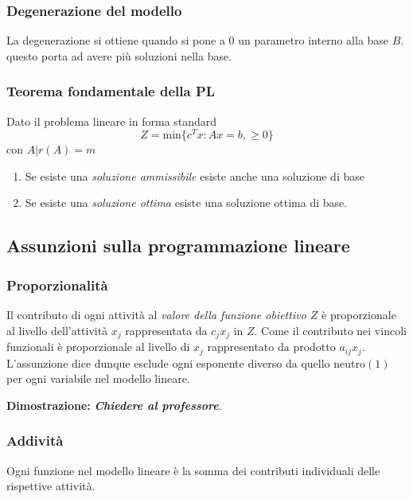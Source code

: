 \documentclass{article}
\begin{document}
    \subsubsection{Degenerazione del modello} 
      La degenerazione si ottiene quando si pone a $0$ un parametro interno alla base $B$. questo porta ad avere più soluzioni nella base.

    \subsubsection{\textbf{Teorema fondamentale della PL}}
      Dato il problema lineare in forma standard
      $$Z=\text{min}\{c^Tx:Ax=b, \ge 0 \}$$
      con $A|r(A)=m$ 
      \begin{enumerate}
        \item Se esiste una \textit{soluzione ammissibile} esiste anche una soluzione di base
        \item Se esiste una \textit{soluzione ottima} esiste una soluzione ottima di base.
      \end{enumerate}

    \subsection{Assunzioni sulla programmazione lineare}
      
      \subsubsection{Proporzionalità}
        Il contributo di ogni attività al \textit{valore della funzione obiettivo $Z$} è proporzionale al livello dell'attività $x_j$ rappresentata da $c_jx_j$ in $Z$. Come il contributo nei vincoli funzionali è proporzionale al livello di $x_j$ rappresentato da prodotto $a_{ij}x_j$. L'assunzione dice dunque esclude ogni esponente diverso da quello neutro$(1)$ per ogni variabile nel modello lineare.

        \begin{tcolorbox}
          \textbf{Dimostrazione:}
            \textbf{\textit{Chiedere al professore}}.
        \end{tcolorbox}

      \subsubsection{Addività}
        Ogni funzione nel modello lineare è la somma dei contributi individuali delle rispettive attività.
\end{document}
